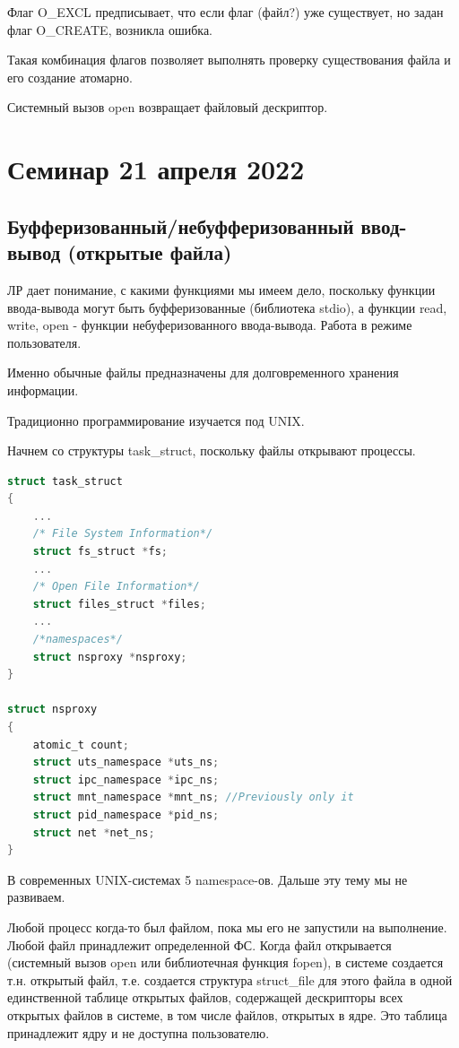 \documentclass[12pt,a4paper]{scrreprt}
\begin{document}
Флаг O\_EXCL предписывает, что если флаг (файл?) уже существует, но задан флаг O\_CREATE, возникла ошибка. 

Такая комбинация флагов позволяет выполнять проверку существования файла и его создание атомарно.

Системный вызов open возвращает файловый дескриптор.

\chapter{\textbf{Семинар 21 апреля 2022}}

\section{Буфферизованный/небуфферизованный ввод-вывод (открытые файла)}

ЛР дает понимание, с какими функциями мы имеем дело, поскольку функции ввода-вывода могут быть буфферизованные (библиотека stdio), а функции read, write, open - функции небуферизованного ввода-вывода. Работа в режиме пользователя.

Именно обычные файлы предназначены для долговременного хранения информации.

Традиционно программирование изучается под UNIX.

Начнем со структуры task\_struct, поскольку файлы открывают процессы.

\begin{lstlisting}[language=C]
struct task_struct 
{
	... 
	/* File System Information*/
	struct fs_struct *fs;
	... 
	/* Open File Information*/
	struct files_struct *files;
	...
	/*namespaces*/
	struct nsproxy *nsproxy;
}

struct nsproxy 
{
	atomic_t count;
	struct uts_namespace *uts_ns;
	struct ipc_namespace *ipc_ns;
	struct mnt_namespace *mnt_ns; //Previously only it
	struct pid_namespace *pid_ns;
	struct net *net_ns;
}
\end{lstlisting}

В современных UNIX-системах 5 namespace-ов. Дальше эту тему мы не развиваем.

Любой процесс когда-то был файлом, пока мы его не запустили на выполнение. Любой файл принадлежит определенной ФС. Когда файл открывается (системный вызов open или библиотечная функция fopen), в системе создается т.н. открытый файл, т.е. создается структура struct\_file для этого файла в одной единственной таблице открытых файлов, содержащей дескрипторы всех открытых файлов в системе, в том числе файлов, открытых в ядре. Это таблица принадлежит ядру и не доступна пользователю.
\end{document}
